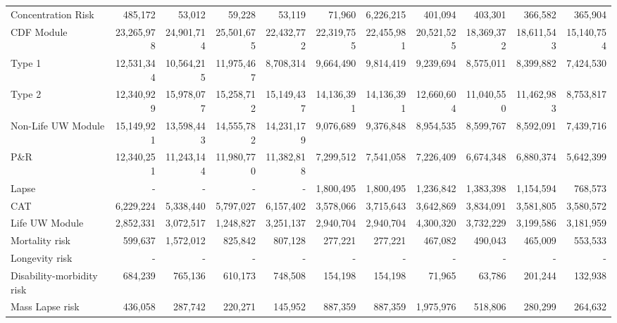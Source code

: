 \begin{landscape}
\begin{longtable}{ l  r  r  r  r  r  r  r  r  r  r  }
    Concentration Risk & 485,172 & 53,012 & 59,228 & 53,119 & 71,960 & 6,226,215 & 401,094 & 403,301 & 366,582 & 365,904 \\

    CDF Module & 23,265,978 & 24,901,714 & 25,501,675 & 22,432,772 & 22,319,755 & 22,455,981 & 20,521,525 & 18,369,372 & 18,611,543 & 15,140,754 \\

    Type 1 & 12,531,344 & 10,564,215 & 11,975,467 & 8,708,314 & 9,664,490 & 9,814,419 & 9,239,694 & 8,575,011 & 8,399,882 & 7,424,530 \\

    Type 2 & 12,340,929 & 15,978,077 & 15,258,712 & 15,149,437 & 14,136,391 & 14,136,391 & 12,660,604 & 11,040,550 & 11,462,983 & 8,753,817 \\

    Non-Life UW Module & 15,149,921 & 13,598,443 & 14,555,782 & 14,231,179 & 9,076,689 & 9,376,848 & 8,954,535 & 8,599,767 & 8,592,091 & 7,439,716 \\

    P\&R & 12,340,251 & 11,243,144 & 11,980,770 & 11,382,818 & 7,299,512 & 7,541,058 & 7,226,409 & 6,674,348 & 6,880,374 & 5,642,399 \\

    Lapse & - & - & - & - & 1,800,495 & 1,800,495 & 1,236,842 & 1,383,398 & 1,154,594 & 768,573 \\

    CAT & 6,229,224 & 5,338,440 & 5,797,027 & 6,157,402 & 3,578,066 & 3,715,643 & 3,642,869 & 3,834,091 & 3,581,805 & 3,580,572 \\

    Life UW Module & 2,852,331 & 3,072,517 & 1,248,827 & 3,251,137 & 2,940,704 & 2,940,704 & 4,300,320 & 3,732,229 & 3,199,586 & 3,181,959 \\

    Mortality risk & 599,637 & 1,572,012 & 825,842 & 807,128 & 277,221 & 277,221 & 467,082 & 490,043 & 465,009 & 553,533 \\

    Longevity risk & - & - & - & - & - & - & - & - & - & - \\

    Disability-morbidity risk & 684,239 & 765,136 & 610,173 & 748,508 & 154,198 & 154,198 & 71,965 & 63,786 & 201,244 & 132,938 \\

    Mass Lapse risk & 436,058 & 287,742 & 220,271 & 145,952 & 887,359 & 887,359 & 1,975,976 & 518,806 & 280,299 & 264,632 \\


\end{longtable}
\end{landscape}
